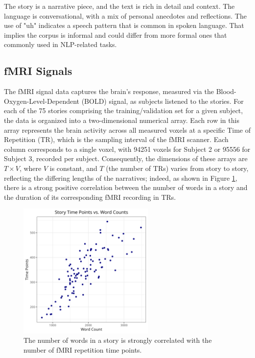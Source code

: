 \documentclass[10pt,letterpaper]{article}
\begin{document}
The story is a narrative piece, and the text is rich in detail and context. The language is conversational, with a mix of personal anecdotes and reflections. The use of "uh" indicates a speech pattern that is common in spoken language. That implies the corpus is informal and could differ from more formal ones that commonly used in NLP-related tasks.

\subsection{fMRI Signals}
The fMRI signal data captures the brain's response, measured via the Blood-Oxygen-Level-Dependent (BOLD) signal, as subjects listened to the stories. For each of the 75 stories comprising the training/validation set for a given subject, the data is organized into a two-dimensional numerical array. Each row in this array represents the brain activity across all measured voxels at a specific Time of Repetition (TR), which is the sampling interval of the fMRI scanner. Each column corresponds to a single voxel, with 94251 voxels for Subject 2 or 95556 for Subject 3, recorded per subject. Consequently, the dimensions of these arrays are \(T \times V\), where \(V\) is constant, and \(T\) (the number of TRs) varies from story to story, reflecting the differing lengths of the narratives; indeed, as shown in Figure \ref{fig:word_count}, there is a strong positive correlation between the number of words in a story and the duration of its corresponding fMRI recording in TRs.

\begin{figure}[ht]
    \centering
    \includegraphics[width=0.6\textwidth]{figs/word_count.png}
    \caption{The number of words in a story is strongly correlated with the number of fMRI repetition time points.}
    \label{fig:word_count}
\end{figure}
\end{document}
